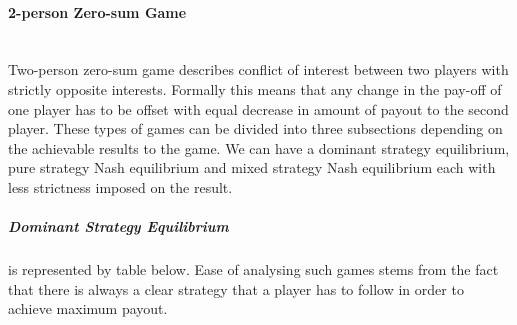 \documentclass[10pt, a4paper]{report}
\begin{document}
\paragraph{2-person Zero-sum Game} ~\\
Two-person zero-sum game describes conflict of interest between two players with strictly opposite interests. Formally this means that any change in the pay-off of one player has to be offset with equal decrease in amount of payout to the second player. These types of games can be divided into three subsections depending on the achievable results to the game. We can have a dominant strategy equilibrium, pure strategy Nash equilibrium and mixed strategy Nash equilibrium each with less strictness imposed on the result.
\subparagraph{Dominant Strategy Equilibrium}
is represented by table below. Ease of analysing such games stems from the fact that there is always a clear strategy that a player has to follow in order to achieve maximum payout.

\end{document}
